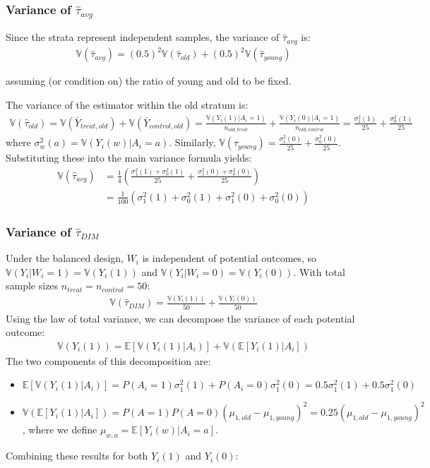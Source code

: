 \documentclass[11pt]{article}
\numberwithin{equation}{section}
\newcommand{\E}{\mathbb{E}}
\newcommand{\Var}{\mathbb{V}}
\begin{document}
\subsubsection{Variance of \texorpdfstring{$\hat{\tau}_{avg}$}{tau\_avg}}

Since the strata represent independent samples, the variance of $\hat{\tau}_{avg}$ is:
\begin{align}
\Var(\hat{\tau}_{avg}) = (0.5)^2 \Var(\hat{\tau}_{old}) + (0.5)^2 \Var(\hat{\tau}_{young})
\end{align}

assuming (or condition on) the ratio of young and old to be fixed.

The variance of the estimator within the old stratum is:
\begin{align}
\Var(\hat{\tau}_{old}) = \Var(\bar{Y}_{treat,old}) + \Var(\bar{Y}_{control,old}) = \frac{\Var(Y_i(1)|A_i=1)}{n_{old,treat}} + \frac{\Var(Y_i(0)|A_i=1)}{n_{old,control}} = \frac{\sigma^2_1(1)}{25} + \frac{\sigma^2_0(1)}{25}
\end{align}
where $\sigma^2_w(a) = \Var(Y_i(w)|A_i=a)$. Similarly, $\Var(\hat{\tau}_{young}) = \frac{\sigma^2_1(0)}{25} + \frac{\sigma^2_0(0)}{25}$.
Substituting these into the main variance formula yields:
\begin{align}
\Var(\hat{\tau}_{avg}) &= \frac{1}{4} \left( \frac{\sigma^2_1(1) + \sigma^2_0(1)}{25} + \frac{\sigma^2_1(0) + \sigma^2_0(0)}{25} \right) \\
&= \frac{1}{100} \left( \sigma^2_1(1) + \sigma^2_0(1) + \sigma^2_1(0) + \sigma^2_0(0) \right)
\end{align}

\subsubsection{Variance of \texorpdfstring{$\hat{\tau}_{DIM}$}{tau\_DIM}}

Under the balanced design, $W_i$ is independent of potential outcomes, so $\Var(Y_i|W_i=1) = \Var(Y_i(1))$ and $\Var(Y_i|W_i=0) = \Var(Y_i(0))$. With total sample sizes $n_{treat}=n_{control}=50$:
\begin{align}
\Var(\hat{\tau}_{DIM}) = \frac{\Var(Y_i(1))}{50} + \frac{\Var(Y_i(0))}{50}
\end{align}
Using the law of total variance, we can decompose the variance of each potential outcome:
\begin{align}
\Var(Y_i(1)) = \E[\Var(Y_i(1)|A_i)] + \Var(\E[Y_i(1)|A_i])
\end{align}
The two components of this decomposition are:
\begin{itemize}
    \item $\E[\Var(Y_i(1)|A_i)] = P(A_i=1)\sigma^2_1(1) + P(A_i=0)\sigma^2_1(0) = 0.5\sigma^2_1(1) + 0.5\sigma^2_1(0)$
    \item $\Var(\E[Y_i(1)|A_i]) = P(A=1)P(A=0)(\mu_{1,old} - \mu_{1,young})^2 = 0.25(\mu_{1,old} - \mu_{1,young})^2$, where we define $\mu_{w,a} = \E[Y_i(w)|A_i=a]$.
\end{itemize}
Combining these results for both $Y_i(1)$ and $Y_i(0)$:
\end{document}
